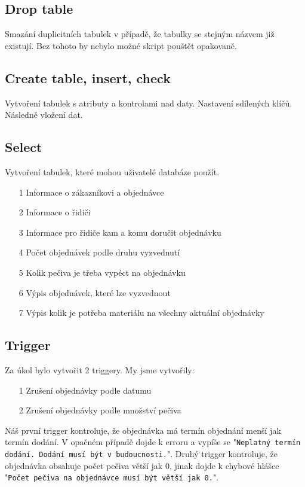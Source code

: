 \documentclass[a4paper, 12pt]{article}
\begin{document}
\subsection{Drop table}
Smazání duplicitních tabulek v případě, že tabulky se stejným názvem již existují. Bez tohoto by nebylo možné skript pouštět opakovaně.

\subsection{Create table, insert, check}
Vytvoření tabulek s atributy a kontrolami nad daty. Nastavení sdílených klíčů. Následně vložení dat.

\subsection{Select}
Vytvoření tabulek, které mohou uživatelé databáze použít.
\begin{itemize}
    \item[1] Informace o zákazníkovi a objednávce
    \item[2] Informace o řidiči
    \item[3] Informace pro řidiče kam a komu doručit objednávku
    \item[4] Počet objednávek podle druhu vyzvednutí
    \item[5] Kolik pečiva je třeba vypéct na objednávku
    \item[6] Výpis objednávek, které lze vyzvednout
    \item[7] Výpis kolik je potřeba materiálu na všechny aktuální objednávky
\end{itemize}

\subsection{Trigger}
Za úkol bylo vytvořit 2 triggery. My jsme vytvořily:
\begin{itemize}
    \item[1] {Zrušení objednávky podle datumu}
    \item[2] {Zrušení objednávky podle množství pečiva}
\end{itemize}
Náš první trigger kontroluje, že objednávka má termín objednání menší jak termín dodání. V opačném případě dojde k erroru a vypíše se "\texttt{Neplatný termín dodání. Dodání musí být v budoucnosti.}".
Druhý trigger kontroluje, že objednávka obsahuje počet pečiva větší jak 0, jinak dojde k chybové hlášce "\texttt{Počet pečiva na objednávce musí být větší jak 0.}".
\end{document}
